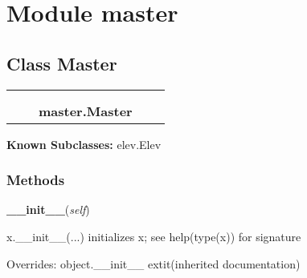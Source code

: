 %
%
%


\section{Module master}

    \label{master}


\subsection{Class Master}

    \label{master:Master}
\begin{tabular}{cccccc}
\multicolumn{2}{r}{\settowidth{\BCL}{object}\multirow{2}{\BCL}{object}}
&&
  \\\cline{3-3}
  &&\multicolumn{1}{c|}{}
&&
  \\
&&\multicolumn{2}{l}{\textbf{master.Master}}
\end{tabular}

\textbf{Known Subclasses:} elev.Elev



  \subsubsection{Methods}

    \vspace{0.5ex}

\hspace{.8\funcindent}\begin{boxedminipage}{\funcwidth}

    \raggedright \textbf{\_\_init\_\_}(\textit{self})

\setlength{\parskip}{2ex}
    x.\_\_init\_\_(...) initializes x; see help(type(x)) for signature

\setlength{\parskip}{1ex}
      Overrides: object.\_\_init\_\_ 	extit{(inherited documentation)}

    \end{boxedminipage}

